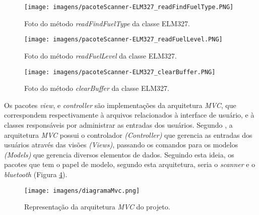 \begin{figure}[!ht]
\centering
\caption{Foto do método \textit{readFindFuelType} da classe ELM327.} 
{\texttt{[image: imagens/pacoteScanner-ELM327\_readFindFuelType.PNG]}}\\
 \label{Fig:elm327_read_find_fuel_type}
\end{figure}

\begin{figure}[!ht]
\centering
\caption{Foto do método \textit{readFuelLevel} da classe ELM327.} 
{\texttt{[image: imagens/pacoteScanner-ELM327\_readFuelLevel.PNG]}}\\
 \label{Fig:elm327_read_fuel_level}
\end{figure}

\begin{figure}[!ht]
\centering
\caption{Foto do método \textit{clearBuffer} da classe ELM327.} 
{\texttt{[image: imagens/pacoteScanner-ELM327\_clearBuffer.PNG]}}\\
 \label{Fig:elm327_clear_buffer}
\end{figure}

Os pacotes \textit{view}, e \textit{controller} são implementações da arquitetura \textit{MVC}, que correspondem respectivamente à arquivos relacionados à interface de usuário, e à classes responsáveis por administrar as entradas dos usuários. Segundo , a arquitetura \textit{MVC} possui o controlador \textit{(Controller)} que gerencia as entradas dos usuários através das visões \textit{(Views)}, passando os comandos para os modelos \textit{(Models)} que gerencia diversos elementos de dados. Seguindo esta ideia, os pacotes que tem o papel de modelo, segundo esta arquitetura, seria o \textit{scanner} e o \textit{bluetooth} (Figura \ref{Fig:diagrama_mvc}).

\begin{figure}[!ht]
\centering
\caption{Representação da arquitetura \textit{MVC} do projeto.} 
{\texttt{[image: imagens/diagramaMvc.png]}}\\
 \label{Fig:diagrama_mvc}
\end{figure}

